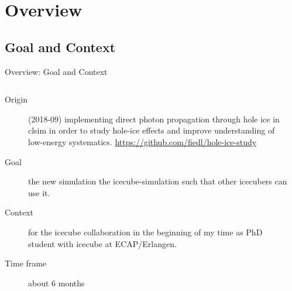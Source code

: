
\newcommand\done{\checkmark\xspace}
\newcommand\inprogress{$\Rightarrow$\xspace}
\newcommand\tobedone{$\square$\xspace}

\section{Overview}
\subsection{Goal and Context}
\begin{frame}[fragile]{Overview: Goal and Context}
  \begin{columns}
    \begin{column}{0.65\textwidth}
      \begin{description}
        \item[Origin]  (2018-09) implementing direct photon propagation through hole ice in clsim in order to study hole-ice effects and improve understanding of low-energy systematics. \small \url{https://github.com/fiedl/hole-ice-study} \normalsize

        \item[Goal]  the new simulation  the icecube-simulation  such that other icecubers can use it.

        \item[Context]  for the icecube collaboration in the beginning of my time as PhD student with icecube at ECAP/Erlangen.

        \item[Time frame] about 6 months
      \end{description}

    \end{column}
    \begin{column}{0.35\textwidth}

    \end{column}
  \end{columns}
\end{frame}

